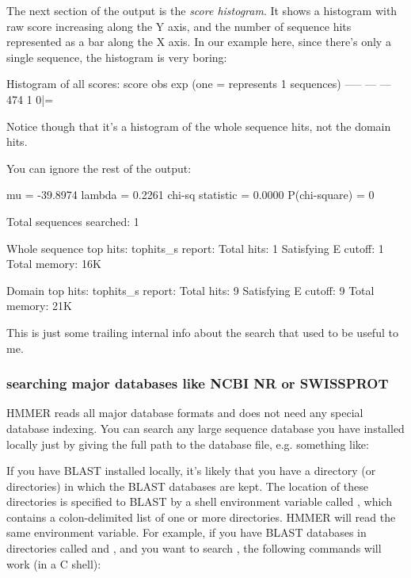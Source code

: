 The next section of the output is the \emph{ score histogram}.  It shows
a histogram with raw score increasing along the Y axis, and the number
of sequence hits represented as a bar along the X axis. In our example
here, since there's only a single sequence, the histogram is very
boring:

\begin{sreoutput}
Histogram of all scores:
score    obs    exp  (one = represents 1 sequences)
-----    ---    ---
  474      1      0|=                                                          
\end{sreoutput}

Notice though that it's a histogram of the whole sequence hits, not
the domain hits.

You can ignore the rest of the  output:

\begin{sreoutput}
              mu =   -39.8974
          lambda =     0.2261
chi-sq statistic =     0.0000
  P(chi-square)  =          0

Total sequences searched: 1

Whole sequence top hits:
tophits_s report:
     Total hits:           1
     Satisfying E cutoff:  1
     Total memory:         16K

Domain top hits:
tophits_s report:
     Total hits:           9
     Satisfying E cutoff:  9
     Total memory:         21K
\end{sreoutput}

This is just some trailing internal info about the search that used to
be useful to me.

\subsubsection{searching major databases like NCBI NR or SWISSPROT}

HMMER reads all major database formats and does not need any special
database indexing. You can search any large sequence database you have
installed locally just by giving the full path to the database file,
e.g. something like:


If you have BLAST installed locally, it's likely that you have a
directory (or directories) in which the BLAST databases are kept.  The
location of these directories is specified to BLAST by a shell
environment variable called , which contains a
colon-delimited list of one or more directories. HMMER will read the
same environment variable. For example, if you have BLAST databases in
directories called  and
, and you want to search
, the following commands will
work (in a C shell):

